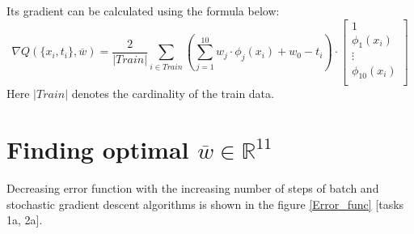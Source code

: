 \documentclass{article}
\begin{document}
Its gradient can be calculated using the formula below:
$$
\nabla Q(\{x_i, t_i\}, \overline{w}) =  \frac{2}{|Train|}\sum\limits_{i \in Train} \left(\sum\limits_{j = 1}^{10} w_j \cdot \phi_j(x_i) + w_0 - t_i \right) \cdot \begin{bmatrix} 1 \\
                                 \phi_1(x_i) \\
                                 \vdots \\
                                 \phi_{10}(x_i)\\
                 \end{bmatrix}
$$
Here $|Train|$ denotes the cardinality of the train data.

\section{Finding optimal $\overline{w} \in \mathbb{R}^{11}$}

Decreasing error function with the increasing number of steps of batch and stochastic gradient descent algorithms is shown in the figure \ref{Error_func} [tasks 1a, 2a].
\end{document}
